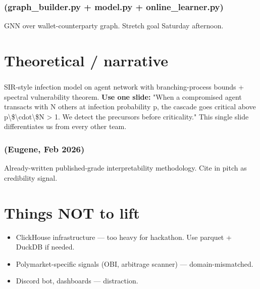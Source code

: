 \documentclass[11pt]{article}
\begin{document}
\subsubsection*{ (graph\_builder.py + model.py + online\_learner.py)}
GNN over wallet-counterparty graph. Stretch goal Saturday afternoon.

\section{Theoretical / narrative}
\subsubsection*{}
SIR-style infection model on agent network with branching-process bounds + spectral vulnerability theorem. \textbf{Use one slide:} "When a compromised agent transacts with N others at infection probability p, the cascade goes critical above p\textbackslash{}\$\textbackslash{}cdot\textbackslash{}\$N > 1. We detect the precursors before criticality." This single slide differentiates us from every other team.

\subsubsection*{ (Eugene, Feb 2026)}
Already-written published-grade interpretability methodology. Cite in pitch as credibility signal.

\section{Things NOT to lift}
\begin{itemize}
  \item ClickHouse infrastructure --- too heavy for hackathon. Use parquet + DuckDB if needed.
  \item Polymarket-specific signals (OBI, arbitrage scanner) --- domain-mismatched.
  \item Discord bot, dashboards --- distraction.
\end{itemize}
\end{document}

